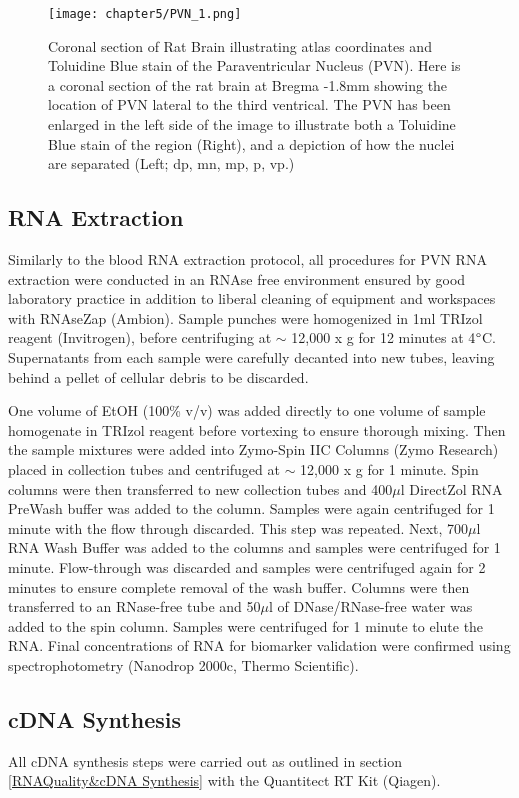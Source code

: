\begin{figure*}[!htbp]
\centering
\texttt{[image: chapter5/PVN\_1.png]}
\caption{Coronal section of Rat Brain illustrating atlas coordinates and Toluidine Blue stain of the Paraventricular Nucleus (PVN). Here is a coronal section of the rat brain at Bregma -1.8mm showing the location of PVN lateral to the third ventrical. The PVN has been enlarged in the left side of the image to illustrate both a Toluidine Blue stain of the region (Right), and a depiction of how the nuclei are separated (Left; \acrfull{dp}, \acrfull{mn}, \acrfull{mp}, \acrfull{p}, \acrfull{vp}.)}
\label{fig:pvn}
\end{figure*}

\subsection{RNA Extraction}
Similarly to the blood RNA extraction protocol, all procedures for PVN RNA extraction were conducted in an RNAse free environment ensured by good laboratory practice in addition to liberal cleaning of equipment and workspaces with RNAseZap (Ambion). Sample punches were homogenized in 1ml TRIzol reagent (Invitrogen), before centrifuging at $\sim$ 12,000 x g for 12 minutes at 4$\degree$C. Supernatants from each sample were carefully decanted into new tubes, leaving behind a pellet of cellular debris to be discarded. 

One volume of EtOH (100\% v/v) was added directly to one volume of sample homogenate in TRIzol reagent before vortexing to ensure thorough mixing. Then the sample mixtures were added into Zymo-Spin IIC Columns (Zymo Research) placed in collection tubes and centrifuged at $\sim$ 12,000 x g for 1 minute. Spin columns were then transferred to new collection tubes and 400$\mu$l DirectZol RNA PreWash buffer was added to the column. Samples were again centrifuged for 1 minute with the flow through discarded. This step was repeated. Next, 700$\mu$l RNA Wash Buffer was added to the columns and samples were centrifuged for 1 minute. Flow-through was discarded and samples were centrifuged again for 2 minutes to ensure complete removal of the wash buffer. Columns were then transferred to an RNase-free tube and 50$\mu$l of DNase/RNase-free water was added to the spin column. Samples were centrifuged for 1 minute to elute the RNA. Final concentrations of RNA for biomarker validation were confirmed using spectrophotometry (Nanodrop 2000c, Thermo Scientific).

\subsection{cDNA Synthesis}
All cDNA synthesis steps were carried out as outlined in section \ref{RNAQuality&cDNA Synthesis} with the Quantitect RT Kit (Qiagen).

